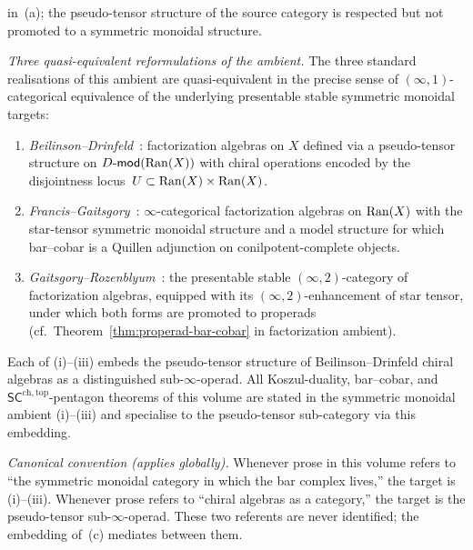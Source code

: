 \begin{remark}
\begin{enumerate}[label=\textup{(\alph*)}]
 in~(a); the pseudo-tensor structure of the source category is
 respected but not promoted to a symmetric monoidal structure.
\end{enumerate}
\emph{Three quasi-equivalent reformulations of the ambient.} The
three standard realisations of this ambient are quasi-equivalent in
the precise sense of $(\infty,1)$-categorical equivalence of the
underlying presentable stable symmetric monoidal targets:
\begin{enumerate}[label=\textup{(\roman*)}]
\item \emph{Beilinson--Drinfeld}~\cite[\S 3.4]{BD04}: factorization
 algebras on $X$ defined via a pseudo-tensor structure on
 $D\text{-}\mathsf{mod}(\mathrm{Ran}(X))$ with chiral operations encoded by the
 disjointness locus~$U \subset \mathrm{Ran}(X)\times\mathrm{Ran}(X)$.
\item \emph{Francis--Gaitsgory}~\cite{FG12}: $\infty$-categorical
 factorization algebras on $\mathrm{Ran}(X)$ with the star-tensor
 symmetric monoidal structure and a model structure for which
 bar--cobar is a Quillen adjunction on conilpotent-complete
 objects.
\item \emph{Gaitsgory--Rozenblyum}~\cite[IV.5]{GR17}: the
 presentable stable $(\infty,2)$-category of factorization
 algebras, equipped with its $(\infty,2)$-enhancement of star
 tensor, under which both forms are promoted to properads (cf.\
 Theorem~\ref{thm:properad-bar-cobar} in factorization ambient).
\end{enumerate}
Each of (i)--(iii) embeds the pseudo-tensor structure of
Beilinson--Drinfeld chiral algebras as a distinguished
sub-$\infty$-operad. All Koszul-duality, bar--cobar, and
$\mathsf{SC}^{\mathrm{ch,top}}$-pentagon theorems of this volume are
stated in the symmetric monoidal ambient (i)--(iii) and specialise
to the pseudo-tensor sub-category via this embedding.

\emph{Canonical convention (applies globally).} Whenever prose in
this volume refers to ``the symmetric monoidal category in which the
bar complex lives,'' the target is (i)--(iii). Whenever prose refers
to ``chiral algebras as a category,'' the target is the pseudo-tensor
sub-$\infty$-operad. These two referents are never identified; the
embedding of~(c) mediates between them.
\end{remark}

